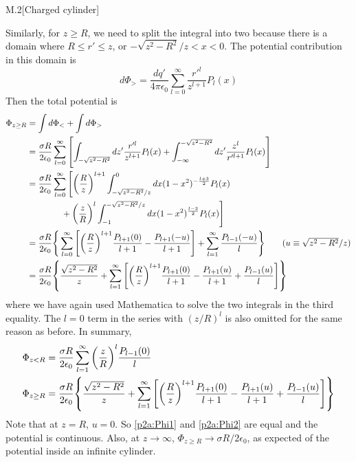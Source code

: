 \documentclass[12pt]{article}
\begin{document}
\begin{problem}{M.2}[Charged cylinder]
\begin{solution}
Similarly, for $z\geq R$, we need to split the integral into two because there 
is a domain where $R\leq r'\leq z$, or $-\sqrt{z^2-R^2} /z<x<0$. The potential
contribution in this domain is
\begin{equation}
    d\Phi_>=\frac{dq'}{4\pi\epsilon_0}\sum_{l=0}^\infty
    \frac{r'^{l}}{z^{l+1}}P_l(x) 
\end{equation}
Then the total potential is
\begin{align}
    \Phi_{z\geq R}
    &=\int d\Phi_<
    +\int d\Phi_>\notag\\
    &=\frac{\sigma R}{2\epsilon_0}\sum_{l=0}^\infty\qty[
        \int_{-\sqrt{z^2-R^2}}dz'\frac{r'^l}{z^{l+1}}P_l(x)
        +\int_{-\infty}^{-\sqrt{z^2-R^2}}dz'\frac{z^l}{r'^{l+1}}P_l(x)
    ]\notag\\
    &=\frac{\sigma R}{2\epsilon_0}\sum_{l=0}^\infty\Bigg[
        \qty(\frac{R}{z})^{l+1}\int_{-\sqrt{z^2-R^2}/z}^0dx(1-x^2)^{-\frac{l+3}{2}}P_l(x)\notag\\
    &\qquad\qquad
        +\qty(\frac{z}{R})^l\int_{-1}^{-\sqrt{z^2-R^2}/z}dx(1-x^2)^{\frac{l-2}{2}}P_l(x)
    \Bigg]\notag\\
    &=\frac{\sigma R}{2\epsilon_0}\Bigg\{
        \sum_{l=0}^\infty\qty[\qty(\frac{R}{z})^{l+1}\frac{P_{l+1}(0)}{l+1}-\frac{P_{l+1}(-u)}{l+1}]
        +\sum_{l=1}^\infty\frac{P_{l-1}(-u)}{l}
    \Bigg\}\tag{$u\equiv\sqrt{z^2-R^2}/z$}\\
    &=\frac{\sigma
    R}{2\epsilon_0}\qty{\frac{\sqrt{z^2-R^2}}{z}+\sum_{l=1}^\infty
    \qty[\qty(\frac{R}{z})^{l+1}\frac{P_{l+1}(0)}{l+1}-\frac{P_{l+1}(u)}{l+1}+\frac{P_{l-1}(u)}{l}]
    }
\end{align}
where we have again used Mathematica to solve the two integrals in the third
equality. The $l=0$ term in the series with $(z /R)^l$ is also omitted
for the same reason as before. In summary,
\begin{subequations}\label{p2a:Phi}
    \begin{align}
        \Phi_{z<R}&=\frac{\sigma
        R}{2\epsilon_0}\sum_{l=1}^\infty\qty(\frac{z}{R})^l\frac{P_{l-1}(0)}{l}\label{p2a:Phi1}\\
        \Phi_{z\geq R}&=\frac{\sigma
    R}{2\epsilon_0}\qty{\frac{\sqrt{z^2-R^2}}{z}+\sum_{l=1}^\infty
    \qty[\qty(\frac{R}{z})^{l+1}\frac{P_{l+1}(0)}{l+1}-\frac{P_{l+1}(u)}{l+1}+\frac{P_{l-1}(u)}{l}]
}  \label{p2a:Phi2} 
    \end{align}
\end{subequations}
Note that at $z=R$, $u=0$. So \eqref{p2a:Phi1} and \eqref{p2a:Phi2} are equal
and the potential is continuous. Also, at $z\to\infty$, $\Phi_{z\geq R}\to\sigma
R /2\epsilon_0$, as expected of the potential inside an infinite cylinder.


\end{solution}
\end{problem}
\end{document}
